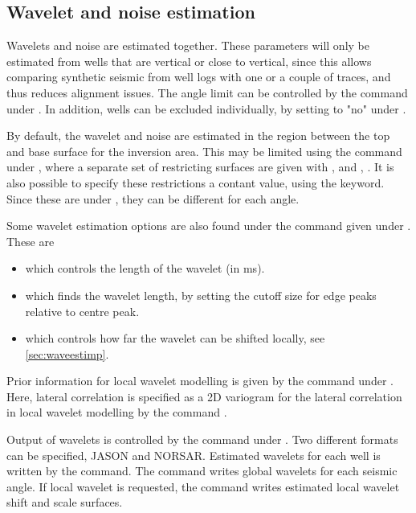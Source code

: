 \subsection{Wavelet and noise estimation}
Wavelets and noise are estimated together. These parameters will only
be estimated from wells that are vertical or close to vertical, since
this allows comparing synthetic seismic from well logs with one or a
couple of traces, and thus reduces alignment issues. The angle limit
can be controlled by the
 command
under . In addition, wells can be excluded individually,
by setting  to "no" under . 

By default, the wavelet and noise are estimated in the region between
the top and base surface for the inversion area. This may be limited
using the  command under 
, where a separate set of restricting surfaces are given
with ,  and 
, . It is
also possible to specify these restrictions a contant value, using
the  keyword. Since these are
under , they can be different for each angle. 

Some wavelet estimation options are also found under the command
 given under . These are 
\begin{itemize}
\item {} which controls the length of the wavelet (in ms).
\item {} which finds the wavelet
  length, by setting the cutoff size for edge peaks relative to centre
  peak. 
\item {} which controls how far the wavelet
  can be shifted locally, see \autoref{sec:waveestimp}. 
\end{itemize}

Prior information for local wavelet modelling is given by the
 command under . Here, lateral
correlation is specified as  a 2D variogram for the lateral
correlation in local wavelet modelling by the command
. 

Output of wavelets is controlled by the  command under . 
Two different formats can be specified, JASON and NORSAR. Estimated wavelets for each well is written by the 
 command. The command  
writes global wavelets for each seismic angle. If local wavelet is requested, the command 
 writes estimated local wavelet shift and scale surfaces.

